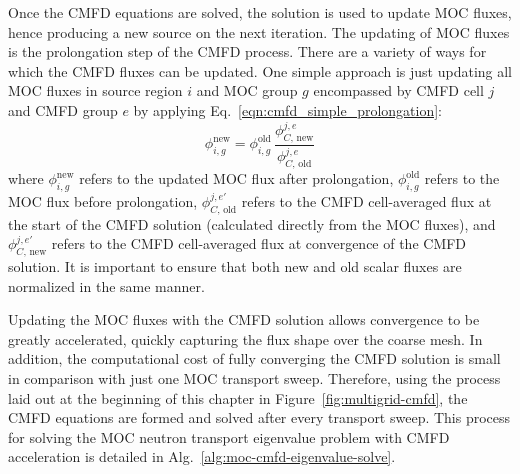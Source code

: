 Once the CMFD equations are solved, the solution is used to update MOC fluxes, hence producing a new source on the next iteration. The updating of MOC fluxes is the prolongation step of the CMFD process. There are a variety of ways for which the CMFD fluxes can be updated. One simple approach is just updating all MOC fluxes in source region $i$ and MOC group $g$ encompassed by CMFD cell $j$ and CMFD group $e$ by applying Eq.~\ref{eqn:cmfd_simple_prolongation}:
\begin{equation}
\phi_{i,g}^{\text{new}} = \phi_{i,g}^{\text{old}} \, \frac{\phi_{C, \, \text{new}}^{j,e}}{\phi_{C, \, \text{old}}^{j,e}}
\label{eqn:cmfd_simple_prolongation}
\end{equation}
where $\phi_{i,g}^{\text{new}}$ refers to the updated MOC flux after prolongation, $\phi_{i,g}^{\text{old}}$ refers to the MOC flux before prolongation, $\phi_{C, \, \text{old}}^{j,e'}$ refers to the CMFD cell-averaged flux at the start of the CMFD solution (calculated directly from the MOC fluxes), and $\phi_{C, \, \text{new}}^{j,e'}$ refers to the CMFD cell-averaged flux at convergence of the CMFD solution. It is important to ensure that both new and old scalar fluxes are normalized in the same manner.

Updating the MOC fluxes with the CMFD solution allows convergence to be greatly accelerated, quickly capturing the flux shape over the coarse mesh. In addition, the computational cost of fully converging the CMFD solution is small in comparison with just one MOC transport sweep. Therefore, using the process laid out at the beginning of this chapter in Figure~\ref{fig:multigrid-cmfd}, the CMFD equations are formed and solved after every transport sweep. This process for solving the MOC neutron transport eigenvalue problem with CMFD acceleration is detailed in Alg.~\ref{alg:moc-cmfd-eigenvalue-solve}.

